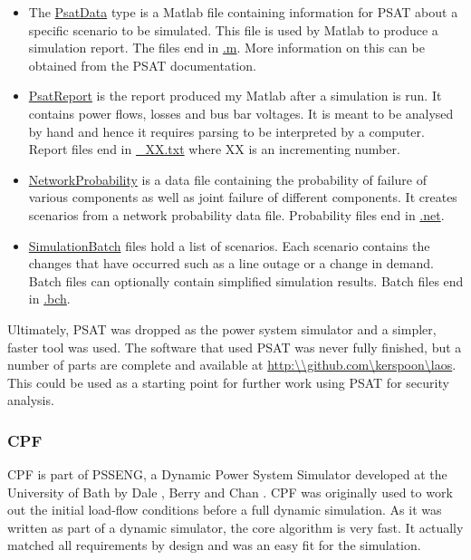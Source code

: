 \documentclass[a4paper,oneside,12pt]{report}
\newenvironment{vivacorrections}
{}
{}
\begin{document}
\begin{itemize}

\item The \underline{PsatData} type is a Matlab file containing information for PSAT about a specific scenario to be simulated. This file is used by Matlab to produce a simulation report. The files end in \underline{.m}. More information on this can be obtained from the PSAT documentation.

\item \underline{PsatReport} is the report produced my Matlab after a simulation is run. It contains power flows, losses and bus bar voltages. It is meant to be analysed by hand and hence it requires parsing to be interpreted by a computer. Report files end in \underline{\_XX.txt} where XX is an incrementing number.

 \item \underline{NetworkProbability} is a data file containing the probability of failure of various components as well as joint failure of different components. It creates scenarios from a network probability data file. Probability files end in \underline{.net}.

\item \underline{SimulationBatch} files hold a list of scenarios. Each scenario contains the changes that have occurred such as a line outage or a change in demand. Batch files can optionally contain simplified simulation results. Batch files end in \underline{.bch}.
\end{itemize}


\begin{vivacorrections}
Ultimately, PSAT was dropped as the power system simulator and a simpler, faster tool was used. The software that used PSAT was never fully finished, but a number of parts are complete and available at \url{http:\\github.com\kerspoon\laos}. This could be used as a starting point for further work using PSAT for security analysis.
\end{vivacorrections}

\subsubsection{CPF}

CPF is part of PSSENG, a Dynamic Power System Simulator developed at the University of Bath by 
Dale \cite{Dale1986}, Berry \cite{Berry1989} and Chan \cite{Chan1992}. CPF was originally used to work out the initial load-flow conditions before a full dynamic simulation. As it was written as part of a dynamic simulator, the core algorithm is very fast. It actually matched all requirements by design and was an easy fit for the simulation. 
\end{document}
